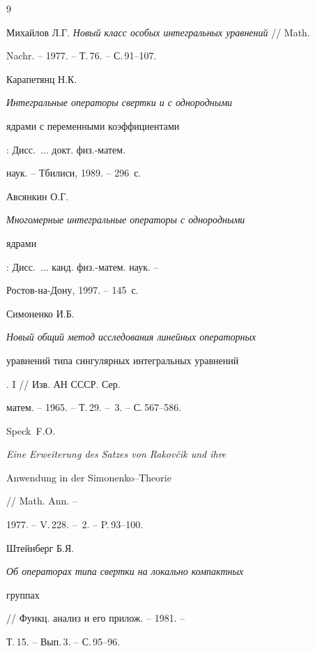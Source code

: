 \begin{thebibliography}{9}







Михайлов Л.Г. {\em Новый класс особых интегральных уравнений} // Math.


Nachr. -- 1977. -- Т.\,76. -- С.\,91--107.







Карапетянц Н.К. {\em Интегральные операторы свертки и с однородными


ядрами с переменными коэффициентами}: Дисс.~$\dotsc$ докт. физ.-матем.


наук. -- Тбилиси, 1989. -- 296~с.







Авсянкин О.Г. {\em Многомерные интегральные операторы с однородными


ядрами}: Дисс.~$\dotsc$ канд. физ.-матем. наук. --


Ростов-на-Дону, 1997. -- 145~с.







Симоненко И.Б. {\em Новый общий метод исследования линейных операторных


уравнений типа сингулярных интегральных уравнений}. I // Изв. АН СССР. Сер.


матем. -- 1965. -- Т.\,29. -- \No\,3. -- С.\,567--586.







Speck~F.O. {\em Eine Erweiterung des Satzes von Rakov\v c{}ik und ihre


Anwendung in der Simonenko--Theorie} // Math. Ann. --


1977. -- V.\,228. -- \No\,2. -- P.\,93--100.







Штейнберг Б.Я. {\em Об операторах типа свертки на локально компактных


группах} // Функц. анализ и его прилож. -- 1981. --


Т.\,15. -- Вып.\,3. -- С.\,95--96.








\end{thebibliography}





\vskip 0.5cm












\label{end}





